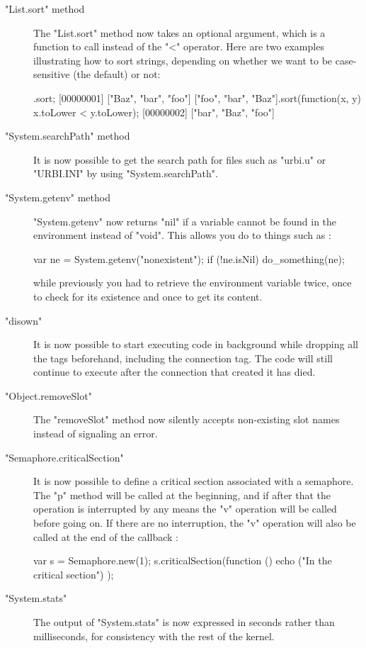 \begin{description}
\item["List.sort" method]

The "List.sort" method now takes an optional argument, which is a
function to call instead of the "<" operator. Here are two examples
illustrating how to sort strings, depending on whether we want to
be case-sensitive (the default) or not:

\begin{urbiscript}
.sort;
[00000001] ["Baz", "bar", "foo"]
["foo", "bar", "Baz"].sort(function(x, y) {x.toLower < y.toLower});
[00000002] ["bar", "Baz", "foo"]
\end{urbiscript}

\item["System.searchPath" method]

It is now possible to get the search path for files such as "urbi.u"
or "URBI.INI" by using "System.searchPath".

\item["System.getenv" method]

"System.getenv" now returns "nil" if a variable cannot be found in
the environment instead of "void". This allows you do to things such
as :

\begin{urbiscript}
var ne = System.getenv("nonexistent");
if (!ne.isNil) do_something(ne);
\end{urbiscript}

while previously you had to retrieve the environment variable twice,
once to check for its existence and once to get its content.

\item["disown"]

It is now possible to start executing code in background while
dropping all the tags beforehand, including the connection tag. The
code will still continue to execute after the connection that created
it has died.

\item["Object.removeSlot"]

The "removeSlot" method now silently accepts non-existing slot
names instead of signaling an error.

\item["Semaphore.criticalSection"]

It is now possible to define a critical section associated with
a semaphore. The "p" method will be called at the beginning,
and if after that the operation is interrupted by any means the
"v" operation will be called before going on. If there are no
interruption, the "v" operation will also be called at the end
of the callback :

\begin{urbiunchecked}
var s = Semaphore.new(1);
s.criticalSection(function () { echo ("In the critical section") });
\end{urbiunchecked}

\item["System.stats"]

The output of "System.stats" is now expressed in seconds rather than
milliseconds, for consistency with the rest of the kernel.
\end{description}

